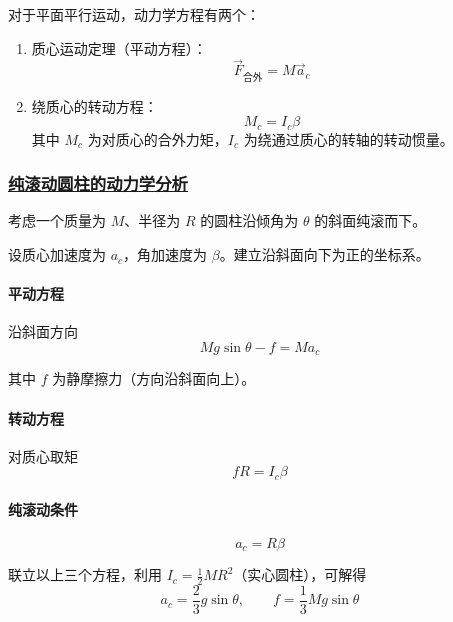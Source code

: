 对于平面平行运动，动力学方程有两个：
\begin{enumerate}
    \item 质心运动定理（平动方程）：
    \begin{equation}
        \vec{F}_{\text{合外}} = M\vec{a}_c
    \end{equation}
    \item 绕质心的转动方程：
    \begin{equation}
        M_c = I_c \beta
    \end{equation}
    其中 $M_c$ 为对质心的合外力矩，$I_c$ 为绕通过质心的转轴的转动惯量。
\end{enumerate}

\subsubsection{\protect\hyperlink{:}{纯滚动圆柱的动力学分析}}

考虑一个质量为 $M$、半径为 $R$ 的圆柱沿倾角为 $\theta$ 的斜面纯滚而下。

设质心加速度为 $a_c$，角加速度为 $\beta$。建立沿斜面向下为正的坐标系。

\paragraph*{平动方程} 沿斜面方向
\begin{equation}
    Mg\sin\theta - f = Ma_c
\end{equation}

其中 $f$ 为静摩擦力（方向沿斜面向上）。

\paragraph*{转动方程} 对质心取矩
\begin{equation}
    fR = I_c\beta
\end{equation}

\paragraph*{纯滚动条件}
\begin{equation}
    a_c = R\beta
\end{equation}

联立以上三个方程，利用 $I_c = \frac{1}{2}MR^2$（实心圆柱），可解得
\begin{equation}
    a_c = \frac{2}{3}g\sin\theta, \qquad f = \frac{1}{3}Mg\sin\theta
\end{equation}

